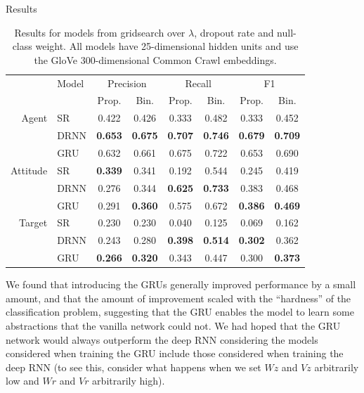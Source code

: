 \documentclass[final]{beamer}
\newlength{\onecolwid}
\newcommand{\bb}[1]{\textbf{#1}}
\begin{document}
\begin{frame}[t]
\begin{columns}[t]
\begin{column}{\onecolwid}
\begin{block}{Results}
\begin{table}[h]
\centering
\small
\begin{tabular}{r | l | c c | c c | c c |} \cline{2-8}
         & Model & \multicolumn{2}{|c|}{Precision} & \multicolumn{2}{|c|}{Recall} & \multicolumn{2}{|c|}{F1} \\ \cline{2-8}
         &       & Prop. & Bin.  & Prop. & Bin.  & Prop. & Bin. \\ \cline{2-8}
Agent    & SR    & 0.422      & 0.426      & 0.333      & 0.482      & 0.333      & 0.452      \\
         & DRNN  & \bb{0.653} & \bb{0.675} & \bb{0.707} & \bb{0.746} & \bb{0.679} & \bb{0.709} \\
         & GRU   & 0.632      & 0.661      & 0.675      & 0.722      & 0.653      & 0.690      \\ \cline{2-8}
Attitude & SR    & \bb{0.339} & 0.341      & 0.192      & 0.544      & 0.245      & 0.419      \\
         & DRNN  & 0.276      & 0.344      & \bb{0.625} & \bb{0.733} & 0.383      & 0.468      \\
         & GRU   & 0.291      & \bb{0.360} & 0.575      & 0.672      & \bb{0.386} & \bb{0.469} \\ \cline{2-8}
Target   & SR    & 0.230      & 0.230      & 0.040      & 0.125      & 0.069      & 0.162      \\
         & DRNN  & 0.243      & 0.280      & \bb{0.398} & \bb{0.514} & \bb{0.302} & 0.362      \\
         & GRU   & \bb{0.266} & \bb{0.320} & 0.343      & 0.447      & 0.300      & \bb{0.373} \\ \cline{2-8}
\end{tabular}
\caption{Results for models from gridsearch over $\lambda$, dropout rate and null-class weight. All models have 25-dimensional hidden units and use the GloVe 300-dimensional Common Crawl embeddings.}
\end{table}

We found that introducing the GRUs generally improved performance by a small amount, and that the amount of improvement scaled with the ``hardness'' of the classification problem, suggesting that the GRU enables the model to learn some abstractions that the vanilla network could not. We had hoped that the GRU network would always outperform the deep RNN considering the models considered when training the GRU include those considered when training the deep RNN (to see this, consider what happens when we set $Wz$ and $Vz$ arbitrarily low and $Wr$ and $Vr$ arbitrarily high).


\end{block}
\end{column}
\end{columns}
\end{frame}
\end{document}
